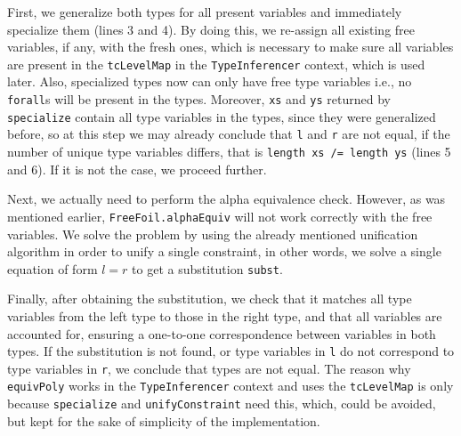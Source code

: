 First, we generalize both types for all present variables and immediately specialize them (lines 3 and 4). By doing this, we re-assign all existing free variables, if any, with the fresh ones, which is necessary to make sure all variables are present in the \texttt{tcLevelMap} in the \texttt{TypeInferencer} context, which is used later. Also, specialized types now can only have free type variables i.e., no \texttt{forall}s will be present in the types. Moreover, \texttt{xs} and \texttt{ys} returned by \texttt{specialize} contain all type variables in the types, since they were generalized before, so at this step we may already conclude that \texttt{l} and \texttt{r} are not equal, if the number of unique type variables differs, that is \texttt{length xs /= length ys} (lines 5 and 6). If it is not the case, we proceed further.

Next, we actually need to perform the alpha equivalence check. However, as was mentioned earlier, \texttt{FreeFoil.alphaEquiv} will not work correctly with the free variables. We solve the problem by using the already mentioned unification algorithm in order to unify a single constraint, in other words, we solve a single equation of form $l = r$ to get a substitution \texttt{subst}.

Finally, after obtaining the substitution, we check that it matches all type variables from the left type to those in the right type, and that all variables are accounted for, ensuring a one-to-one correspondence between variables in both types. If the substitution is not found, or type variables in \texttt{l} do not correspond to type variables in \texttt{r}, we conclude that types are not equal. The reason why \texttt{equivPoly} works in the \texttt{TypeInferencer} context and uses the \texttt{tcLevelMap} is only because \texttt{specialize} and \texttt{unifyConstraint} need this, which, could be avoided, but kept for the sake of simplicity of the implementation.
